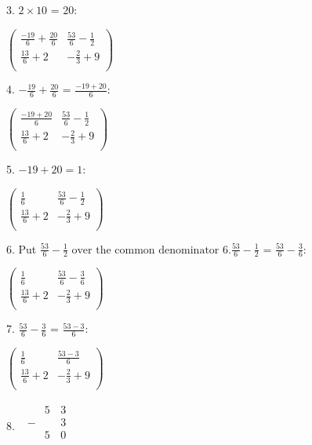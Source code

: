 \documentclass{article}
\begin{document}
3. $2\times 10\text{ = }20:$

$\left(
\begin{array}{cc}
\frac{-19}{6}+\frac{20}{6} & \frac{53}{6}-\frac{1}{2} \\
 \frac{13}{6}+2 & -\frac{2}{3}+9 \\
\end{array}
\right)$

4. $-\frac{19}{6}+\frac{20}{6}\text{ = }\frac{-19+20}{6}$:

$\left(
\begin{array}{cc}
\frac{-19+20}{6} & \frac{53}{6}-\frac{1}{2} \\
 \frac{13}{6}+2 & -\frac{2}{3}+9 \\
\end{array}
\right)$

5. $-19+20=1:$

$\left(
\begin{array}{cc}
\frac{1}{6} & \frac{53}{6}-\frac{1}{2} \\
 \frac{13}{6}+2 & -\frac{2}{3}+9 \\
\end{array}
\right)$

6. Put $\frac{53}{6}-\frac{1}{2}\text{ over the common denominator }6. \frac{53}{6}-\frac{1}{2}\text{ = }\frac{53}{6}-\frac{3}{6}$:

$\left(
\begin{array}{cc}
\frac{1}{6} & \frac{53}{6}-\frac{3}{6} \\
 \frac{13}{6}+2 & -\frac{2}{3}+9 \\
\end{array}
\right)$

7. $\frac{53}{6}-\frac{3}{6}\text{ = }\frac{53-3}{6}$:

$\left(
\begin{array}{cc}
\frac{1}{6} & \frac{53-3}{6} \\
 \frac{13}{6}+2 & -\frac{2}{3}+9 \\
\end{array}
\right)$

8. $\begin{array}{c}
\begin{array}{ccc}
\text{ }& 5 & 3 \\
 - &\text{  }& 3 \\
\hline
\text{  }& 5 & 0 \\
\end{array}
 \\
\end{array}$
\end{document}
